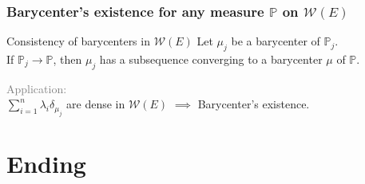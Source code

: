 \documentclass[aspectratio=169]{beamer}
\begin{document}
\begin{frame}
	\frametitle{Barycenter's existence for any measure $\mathbb{P}$ on $\mathcal{W}(E)$}
	\begin{block}{Consistency of barycenters in $\mathcal{W}(E)$}
		Let $\mu_j$ be a barycenter of $\mathbb{P}_j$.\\
		If $\mathbb{P}_j \rightarrow \mathbb{P}$,
		then $\mu_j$ has a subsequence converging to a barycenter $\mu$ of $\mathbb{P}$.
	\end{block}

	\vfill
	\textcolor{gray}{Application:}\\[0.2cm]

	$\sum_{i=1}^n \lambda_i \delta_{\mu_j}$ are dense in $\mathcal{W}(E)$ $\implies$ Barycenter's existence.
\end{frame}

\section{Ending}
\end{document}
